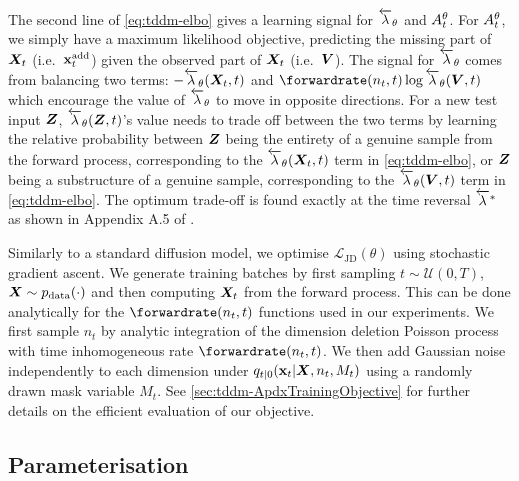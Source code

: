 The second line of \cref{eq:tddm-elbo} gives a learning signal for $\overleftarrow{\lambda}_\theta$ and $A_{t}^\theta$.
For $A_{t}^\theta$, we simply have a maximum likelihood objective, predicting the missing part of ${\bm{X}}_t$ (i.e.~${\mathbf{x}}^{\textup{add}}_t$) given the observed part of ${\bm{X}}_t$ (i.e.~${\bm{V}}$).
The signal for $\overleftarrow{\lambda}_\theta$ comes from balancing two terms: $-\overleftarrow{\lambda}_\theta({\bm{X}}_t, t)$ and $\forwardrate(n_t, t) \log \backwardrate_\theta(\mV, t)$ which encourage the value of $\overleftarrow{\lambda}_\theta$ to move in opposite directions. For a new test input ${\bm{Z}}$, $\overleftarrow{\lambda}_\theta({\bm{Z}}, t)$'s value needs to trade off between the two terms by learning the relative probability between ${\bm{Z}}$ being the entirety of a genuine sample from the forward process, corresponding to the $\overleftarrow{\lambda}_\theta({\bm{X}}_t, t)$ term in \cref{eq:tddm-elbo}, or ${\bm{Z}}$ being a substructure of a genuine sample, corresponding to the $\overleftarrow{\lambda}_\theta({\bm{V}}, t)$ term in \cref{eq:tddm-elbo}. The optimum trade-off is found exactly at the time reversal $\overleftarrow{\lambda}^*$ as shown in Appendix A.5 of \citet{campbell2024trans}.

Similarly to a standard diffusion model, we optimise $\mathcal{L}_\text{JD}(\theta)$ using stochastic gradient ascent. We generate training batches by first sampling $t \sim \mathcal{U}(0, T)$, ${\bm{X}} \sim p_{\rm{data}}(\cdot)$ and then computing ${\bm{X}}_t$ from  the forward process. This can be done analytically for the $\forwardrate(n_t, t)$ functions used in our experiments. We first sample $n_t$ by analytic integration of the dimension deletion Poisson process with time inhomogeneous rate $\forwardrate(n_t, t)$. We then add Gaussian noise independently to each dimension under $q_{t|0}({\mathbf{x}}_t | {\bm{X}}, n_t, M_t)$ using a randomly drawn mask variable $M_t$. See \cref{sec:tddm-ApdxTrainingObjective} for further details on the efficient evaluation of our objective. 

\subsection{Parameterisation}

